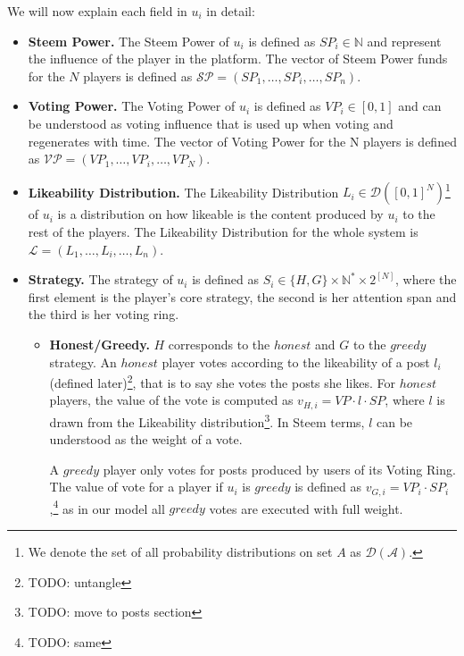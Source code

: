       We will now explain each field in $u_i$ in detail:
      \begin{itemize}
        \item \textbf{Steem Power.} The Steem Power of $u_i$ is defined as
        $SP_{i} \in \mathbb{N}$ and represent the influence of the player in the
        platform. The vector of Steem Power funds for the $N$ players is defined
        as $\mathcal{SP} = \left(SP_{1}, \dots, SP_{i}, \dots, SP_{n}\right)$.
        \item \textbf{Voting Power.} The Voting Power of $u_i$ is defined as
        $VP_i \in \left[0, 1\right]$ and can be understood as  voting influence
        that is used up when voting and regenerates with time. The vector of
        Voting Power for the N players is defined as $\mathcal{VP} = \left(VP_1,
        \dots, VP_i, \dots, VP_N\right)$.

        \item \textbf{Likeability Distribution.} The Likeability Distribution
        $L_i\in \mathcal{D}\left([0,1]^N\right)$\footnote{We denote the set of
        all probability distributions on set $A$ as $\mathcal{D\left(A\right)}$.}
        of $u_i$ is a distribution on how likeable is the content produced by
        $u_i$ to the rest of the players. The Likeability Distribution for the
        whole system is $\mathcal{L} = \left(L_1, \dots, L_i, \dots, L_n\right)$.

        \item \textbf{Strategy.} The strategy of $u_i$ is defined as $S_i \in
        \lbrace H, G \rbrace \times \mathbb{N}^* \times 2^{\left[N\right]}$,
        where the first element is the player's core strategy, the second is her
        attention span and the third is her voting ring.
        \begin{itemize}
          \item \textbf{Honest/Greedy.} $H$ corresponds to the $honest$ and $G$
          to the $greedy$ strategy. An $honest$ player votes according to the
          likeability of a post $l_i$ (defined later)\footnote{TODO: untangle},
          that is to say she votes the posts she likes. For $honest$ players, the
          value of the vote is computed as $v_{H,i} = VP \cdot l \cdot SP$, where
          $l$ is drawn from the Likeability distribution\footnote{TODO: move to
          posts section}. In Steem terms, $l$ can be understood as the weight of
          a vote.

          A $greedy$ player only votes for posts produced by users of its
          Voting Ring. The value of vote for a player if $u_i$ is $greedy$ is
          defined as $v_{G,i} = VP_i \cdot SP_i$,\footnote{TODO: same} as in our
          model all $greedy$ votes are executed with full weight.


\end{itemize}
\end{itemize}
